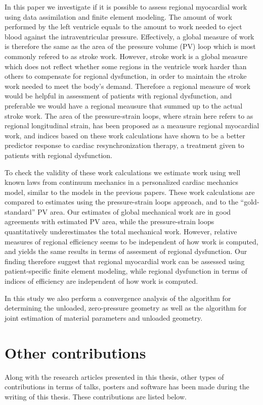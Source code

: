 In this paper we investigate if it is possible to assess regional
myocardial work using data assimilation and finite element modeling.
The amount of work performed by the left ventricle equals to the
amount to work needed to eject blood against the intraventricular
pressure. Effectively, a global measure of work is therefore the same
as the area of the pressure volume (PV) loop which is most commonly refered
to as stroke work.  However, stroke work is a global measure which
does not reflect whether some regions in the ventricle work harder than
others to compensate for regional dysfunction, in order to maintain the
stroke work needed to meet the body's demand. Therefore a regional
measure of work would be helpful in assessment of patients with
regional dysfunction, and preferable we would have a regional meausure
that summed up to the actual stroke work. The area of the
pressure-strain loops, where strain here refers to as regional
longitudinal strain, has been proposed as a meausure regional
myocardial work, and indices based on these work calculations have
shown to be a better predictor response to cardiac resynchronization
therapy, a treatment given to patients with regional dysfunction.

To check the validity of these work calculations we estimate work
using well known laws from continuum mechanics in a personalized
cardiac mechanics model, similar to the models in the previous papers.
These work calculations are compared to estimates using the
pressure-strain loops approach, and to the ``gold-standard'' PV area.
Our estimates of global mechanical work are in good agreements with
estimated PV area, while the pressure-strain loops quantitatively
underestimates the total mechanical work. However, relative measures
of regional efficiency seems to be independent of how work is
computed, and yields the same results in terms of assesment of regional
dysfunction. Our finding therefore suggest that regional myocardial
work can be assessed using patient-specific finite element modeling,
while regional dysfunction in terms of indices of efficiency are
independent of how work is computed.

In this study we also perform a convergence analysis of the algorithm for
determining the unloaded, zero-pressure geometry as well as the
algorithm for joint estimation of material parameters and unloaded
geometry. 

\newpage
\section{Other contributions}
Along with the research articles presented in this thesis, other
types of contributions in terms of talks, posters and software has
been made during the writing of this thesis. These contributions are
listed below.

